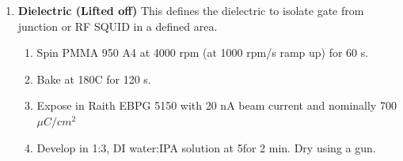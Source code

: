\begin{enumerate}
\begin{enumerate}
        \item Spin PMMA 950 A4 at 4000 rpm (at 1000 rpm/s ramp up) for 60 s.
        \item Bake at 180\degree C for 120 s.
        \item Expose in Raith EBPG 5150 with 20 nA beam current and nominally 700 $\mu C/cm^2 $
        \item Develop in  1:3, DI water:IPA solution at 5\degree for 2 min. Dry using a  gun.
        \item Bake 80\degree C for 5 min. Helps prevent peeling during acid etch.
        \item Al acid etch:
        \begin{enumerate}
            \item Place beaker of Transene Aluminium Etchant Type D in water bath on hot plate and set temperature to 50\degree C. The water temperature should end up being between 29-32 \degree C
            \item Dip sample in etchant until color of large features changes. Wait an additional 3 seconds.
            \item Triple rinse in DI water and blow dry with  gun.
        \end{enumerate}
        \item Standard solvent clean
        \begin{enumerate}
            \item Soak in NMP for 30 mins at 80\degree C.
            \item Soak in Acetone for 1 min.
            \item Soak in IPA for 1 min.
            \item Dry using  gun
        \end{enumerate}
    \end{enumerate}
    \item \textbf{ Dielectric (Lifted off)} This defines the dielectric to isolate gate from junction or RF SQUID in a defined area.
    \begin{enumerate}
        \item Spin PMMA 950 A4 at 4000 rpm (at 1000 rpm/s ramp up) for 60 s.
        \item Bake at 180\degree C for 120 s.
        \item Expose in Raith EBPG 5150 with 20 nA beam current and nominally 700 $\mu C/cm^2 $
        \item Develop in  1:3, DI water:IPA solution at 5\degree for 2 min. Dry using a  gun.

\end{enumerate}
\end{enumerate}

